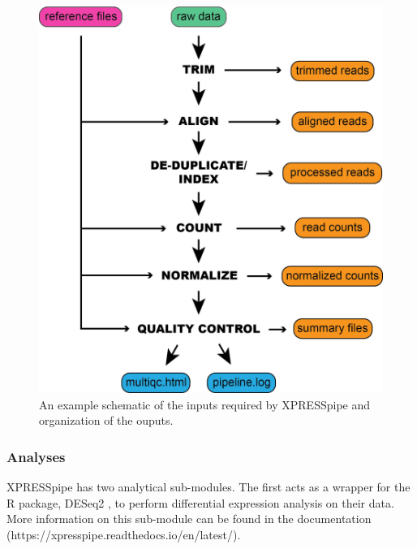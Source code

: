 \documentclass[11pt, a4paper, oneside]{article}
\begin{document}
\begin{figure}
\centering
  \includegraphics[width=120mm]{figures/xpresspipe_overview.png}
  \caption{An example schematic of the inputs required by XPRESSpipe and organization of the ouputs.}
  \label{fig:outputs}
\end{figure}


\subsubsection{Analyses}
XPRESSpipe has two analytical sub-modules. The first acts as a wrapper for the R package, DESeq2 \cite{deseq2}, to perform differential expression analysis on their data. More information on this sub-module can be found in the documentation (https://xpresspipe.readthedocs.io/en/latest/).
\end{document}
